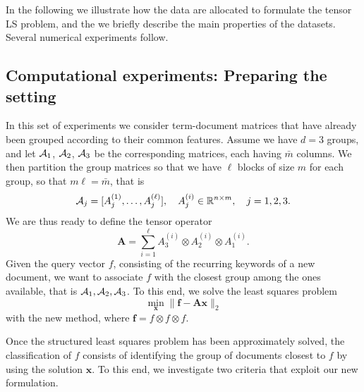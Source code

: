 \documentclass{siamart190516}
\newcommand{\bx}{\bm x}
\begin{document}
In the following we illustrate how the data are allocated to formulate the tensor LS problem, and the we briefly describe the main properties of the datasets. Several numerical experiments follow.



\subsection{Computational experiments: Preparing the setting}\label{sec:expes1}
In this set of experiments we consider term-document matrices that have already been grouped according to 
their common features. Assume we have $d=3$ groups, and
let ${\cal A}_1$, ${\cal A}_2$, ${\cal A}_3$
be the corresponding matrices, each having $\bar m$ columns. We then partition
the group matrices so that we have $\ell$ blocks of
size $m$
for each group, so that $m\ell=\bar m$, that is
\begin{equation}\label{eqn:calA}
{\cal A}_j=[A_j^{(1)}, \ldots,  A_j^{(\ell)}], \quad
A_j^{(i)}\in {\mathbb R}^{n\times m}, \quad
j=1,2,3.
\end{equation}
We are thus ready to define the tensor operator
$$
{\bm A}=\sum_{i=1}^\ell A_3^{(i)}\otimes A_2^{(i)}\otimes A_1^{(i)}.
$$
Given the query vector $f$, consisting of the recurring keywords of a new
document, we want to associate $f$ with the closest
group among the ones available, that is
${\cal A}_1, {\cal A}_2, {\cal A}_3$. To this end, we solve the
least squares problem
\[
\min_{{\bm x}}\| {\bm f} -{\bm A} {\bm x}\|_2
\]
with the new method,
where ${\bm f}=f\otimes f\otimes f$.

Once the structured least squares problem has been approximately solved, the classification of $f$ consists of identifying the group of documents closest to
$f$ by using the solution $\bx$. To this end, we investigate two criteria that exploit our new formulation.

\end{document}
